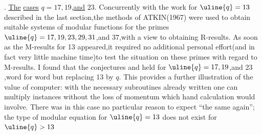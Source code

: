 \noindent {}. \uline{The} \uline{cases} $q=17,19$,\uline{and} $23$. Concurrently with the work for $\uline{q}=13$ described in the last section,the methods of ATKIN(1967) were used to obtain suitable systems of modular functions for the primes $\uline{q}=17,19,23,29,31$,and $37$,with a view to obtaining  \margin{\handwritten{$\delta$/}}R-results. As soon as the M-results for 13 appeared,it required no additional personal effort(and in fact very little machine time)to test the situation on these primes with regard to M-results. I found that the conjectures  and  held for $\uline{q}=17,19$,and $23$,word for word but replacing 13 by \uline{$q$}. This provides a further illustration of the value of  computer: with the necessary subroutines already written one can multiply instances without the loss of momentum which hand calculation would involve. There was in this case no particular reason to expect ``the same again''; the type of modular equation for $\uline{q}=13$ does not exist for $\uline{q}>13$


